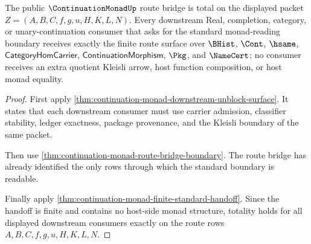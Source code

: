 \begin{theorem}
\label{thm:continuation-monad-public-route-bridge-totality}
The public $\ContinuationMonadUp$ route bridge is total on the displayed packet $Z=(A,B,C,f,g,u,H,K,L,N)$. Every downstream Real, completion, category, or unary-continuation consumer that asks for the standard monad-reading boundary receives exactly the finite route surface over $\BHist$, $\Cont$, $\hsame$, $\mathsf{CategoryHomCarrier}$, $\mathsf{ContinuationMorphism}$, $\Pkg$, and $\NameCert$; no consumer receives an extra quotient Kleisli arrow, host function composition, or host monad equality.
\end{theorem}
\begin{proof}
First apply \autoref{thm:continuation-monad-downstream-unblock-surface}. It states that each downstream consumer must use carrier admission, classifier stability, ledger exactness, package provenance, and the Kleisli boundary of the same packet.

Then use \autoref{thm:continuation-monad-route-bridge-boundary}. The route bridge has already identified the only rows through which the standard boundary is readable.

Finally apply \autoref{thm:continuation-monad-finite-standard-handoff}. Since the handoff is finite and contains no host-side monad structure, totality holds for all displayed downstream consumers exactly on the route rows $A,B,C,f,g,u,H,K,L,N$.
\end{proof}

